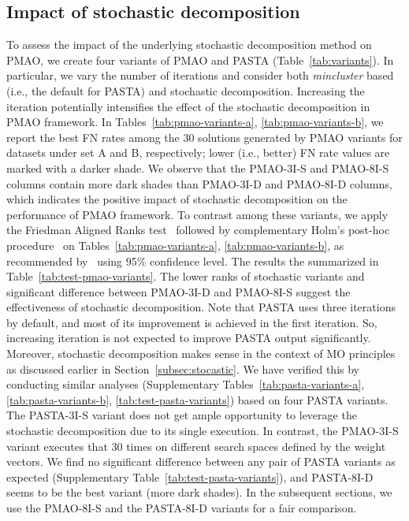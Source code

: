 \documentclass[a4paper,fleqn, review]{cas-dc}
\begin{document}
\subsection{Impact of stochastic decomposition}
To assess the impact of the underlying stochastic decomposition method on PMAO, we create four variants of PMAO and PASTA (Table~\ref{tab:variants}). In particular, we vary the number of iterations and consider both \textit{mincluster} based (i.e., the default for PASTA) and stochastic decomposition. Increasing the iteration potentially intensifies the effect of the stochastic decomposition in PMAO framework. In Tables~\ref{tab:pmao-variants-a},  \ref{tab:pmao-variants-b}, we report the best FN rates among the 30 solutions generated by PMAO variants for datasets under set A and B, respectively; lower (i.e., better) FN rate values are marked with a darker shade.
We observe that the PMAO-3I-S and PMAO-8I-S columns contain more dark shades than PMAO-3I-D and PMAO-8I-D columns, which indicates the positive impact of stochastic decomposition on the performance of PMAO framework. To contrast among these variants, we apply the Friedman Aligned Ranks test~\cite{hodges2012rank} followed by complementary Holm’s post-hoc procedure~\cite{holm1979simple} on Tables~\ref{tab:pmao-variants-a},  \ref{tab:pmao-variants-b}, as recommended by~\cite{derrac2011practical, rodriguez-fdez2015stac} using 95\% confidence level. The results the summarized in Table~\ref{tab:test-pmao-variants}. The lower ranks of stochastic variants and significant difference between PMAO-3I-D and PMAO-8I-S suggest the effectiveness of stochastic decomposition. Note that PASTA uses three iterations by default, and most of its improvement is achieved in the first iteration. So, increasing iteration is not expected to improve PASTA output significantly. Moreover, stochastic decomposition makes sense in the context of MO principles as discussed earlier in Section~\ref{subsec:stocastic}. We have verified this by conducting similar analyses (Supplementary Tables~\ref{tab:pasta-variants-a}, \ref{tab:pasta-variants-b},  \ref{tab:test-pasta-variants}) based on four PASTA variants. The PASTA-3I-S variant does not get ample opportunity to leverage the stochastic decomposition due to its single execution.
In contrast, the PMAO-3I-S variant executes that 30 times on different search spaces defined by the weight vectors. We find no significant difference between any pair of PASTA variants as expected (Supplementary Table~\ref{tab:test-pasta-variants}), and PASTA-8I-D seems to be the best variant (more dark shades). In the subsequent sections, we use the PMAO-8I-S and the PASTA-8I-D variants for a fair comparison.
\end{document}
